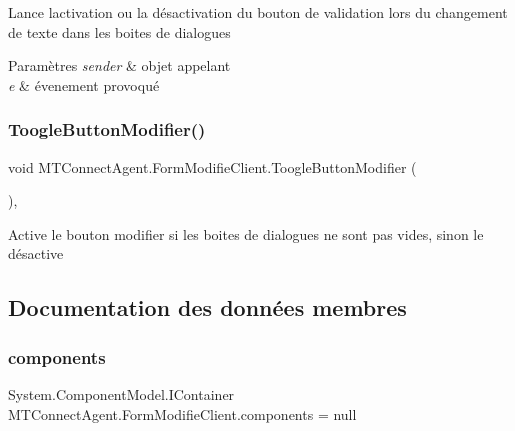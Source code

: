 Lance l\textquotesingle{}activation ou la désactivation du bouton de validation lors du changement de texte dans les boites de dialogues 


\begin{DoxyParams}{Paramètres}
{\em sender} & objet appelant\\
\hline
{\em e} & évenement provoqué\\
\hline
\end{DoxyParams}
\mbox{\label{class_m_t_connect_agent_1_1_form_modifie_client_acea5e363aa37894172a0a938292fa65f}} 
\subsubsection{\texorpdfstring{Toogle\+Button\+Modifier()}{ToogleButtonModifier()}}
{\footnotesize\ttfamily void M\+T\+Connect\+Agent.\+Form\+Modifie\+Client.\+Toogle\+Button\+Modifier (\begin{DoxyParamCaption}{ }\end{DoxyParamCaption})\hspace{0.3cm}{\ttfamily [inline]}, {\ttfamily [private]}}



Active le bouton modifier si les boites de dialogues ne sont pas vides, sinon le désactive 



\subsection{Documentation des données membres}
\mbox{\label{class_m_t_connect_agent_1_1_form_modifie_client_a684d0e616a4b30c46123a53b83f68b24}} 
\subsubsection{\texorpdfstring{components}{components}}
{\footnotesize\ttfamily System.\+Component\+Model.\+I\+Container M\+T\+Connect\+Agent.\+Form\+Modifie\+Client.\+components = null\hspace{0.3cm}{\ttfamily [private]}}



